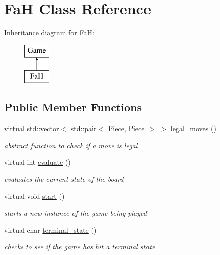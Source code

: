 \hypertarget{class_fa_h}{}\section{FaH Class Reference}
\label{class_fa_h}
Inheritance diagram for FaH\+:\begin{figure}[H]
\begin{center}
\leavevmode
\includegraphics[height=2.000000cm]{class_fa_h}
\end{center}
\end{figure}
\subsection*{Public Member Functions}
\begin{DoxyCompactItemize}
\item 
virtual std\+::vector$<$ std\+::pair$<$ \hyperlink{class_piece}{Piece}, \hyperlink{class_piece}{Piece} $>$ $>$ \hyperlink{class_fa_h_a6bf4d1735a23a2cf51cfe905c4f437a8}{legal\+\_\+moves} ()
\begin{DoxyCompactList}\small\item\em abstract function to check if a move is legal \end{DoxyCompactList}\item 
virtual int \hyperlink{class_fa_h_a79788a0309788fed655c77bea2167110}{evaluate} ()
\begin{DoxyCompactList}\small\item\em evaluates the current state of the board \end{DoxyCompactList}\item 
virtual void \hyperlink{class_fa_h_a21c22430a8fa6d3654cb29244d04d0ab}{start} ()
\begin{DoxyCompactList}\small\item\em starts a new instance of the game being played \end{DoxyCompactList}\item 
virtual char \hyperlink{class_fa_h_a575223df37dc4b747634a7873e399275}{terminal\+\_\+state} ()
\begin{DoxyCompactList}\small\item\em checks to see if the game has hit a terminal state \end{DoxyCompactList}\end{DoxyCompactItemize}
